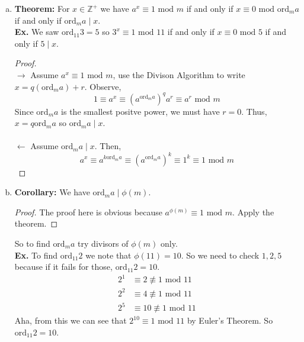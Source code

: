 \documentclass[class=article, crop=false]{standalone}
\def\integers{{\mathbb Z}}
\begin{document}
\begin{enumerate}
\begin{enumerate}[(a)]
	\item \textbf{Theorem:} For $x\in\integers^+$ we have $a^x \equiv 1\mbox{ mod }m$ if and only if
	$x\equiv 0\mbox{ mod } \mbox{ord}_m a$ if and only if $\mbox{ord}_m a \mid x$. \\
	\textbf{Ex.} We saw $\mbox{ord}_{11} 3=5$ so $3^x \equiv 1\mbox{ mod }11$ if and only if $x\equiv 0\mbox{ mod }5$
	if and only if $5\mid x$.
	\begin{proof}
		$ $\\
		$\rightarrow$ Assume $a^x\equiv 1 \mbox{ mod }m$, use the Divison Algorithm to write
		$x = q(\mbox{ord}_m a)+r$. Observe,
		$$1\equiv a^x\equiv \left(a^{\mbox{ord}_m a}\right)^q a^r \equiv a^r\mbox{ mod }m$$
		Since $\mbox{ord}_m a$ is the smallest positve power, we must have $r=0$.
		Thus, $x=q\mbox{ord}_m a$ so $\mbox{ord}_m a\mid x$. \\\\
		$\leftarrow$ Assume $\mbox{ord}_m a\mid x$. Then, 
		$$a^x \equiv a^{k\mbox{ord}_m a} \equiv \left(a^{\mbox{ord}_m a}\right)^k \equiv 1^k \equiv 1\mbox{ mod }m$$
	\end{proof}

	\item \textbf{Corollary:} We have $\mbox{ord}_m a \mid \phi(m)$.
	\begin{proof}
		The proof here is obvious because $a^{\phi(m)} \equiv 1\mbox{ mod }m$. Apply the theorem.
	\end{proof}
	\noindent So to find $\mbox{ord}_m a$ try divisors of $\phi(m)$ only. \\
	\textbf{Ex.} To find $\mbox{ord}_{11} 2$ we note that $\phi(11)=10$.
	So we need to check $1,2,5$ because if it fails for those, $\mbox{ord}_{11} 2 =10$.
	\begin{align*}
		2^1 &\equiv 2\not\equiv 1\mbox{ mod }11 \\
		2^2 &\equiv 4\not\equiv 1\mbox{ mod }11 \\
		2^5 &\equiv 10\not\equiv 1\mbox{ mod }11
	\end{align*}
	Aha, from this we can see that $2^{10} \equiv 1\mbox{ mod } 11$ by Euler's Theorem. So $\mbox{ord}_{11} 2 = 10$.


\end{enumerate}
\end{enumerate}
\end{document}
